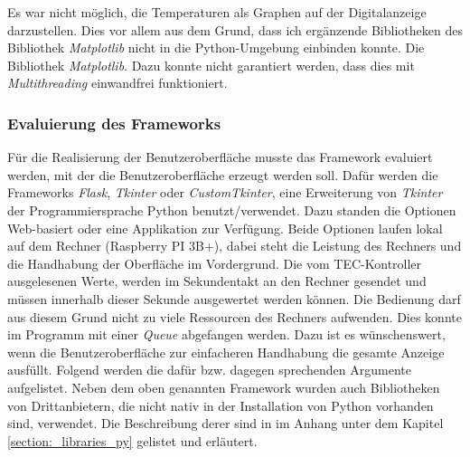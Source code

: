 Es war nicht möglich, die Temperaturen als Graphen auf der Digitalanzeige darzustellen. Dies vor allem aus dem Grund, dass ich ergänzende Bibliotheken des Bibliothek \textit{Matplotlib} nicht in die Python-Umgebung einbinden konnte. Die Bibliothek \textit{Matplotlib}. Dazu konnte nicht garantiert werden, dass dies mit \textit{Multithreading} einwandfrei funktioniert.

\subsubsection{Evaluierung des Frameworks}
Für die Realisierung der Benutzeroberfläche musste das Framework evaluiert werden, mit der die Benutzeroberfläche erzeugt werden soll. Dafür werden die Frameworks \textit{Flask}, \textit{Tkinter} oder \textit{CustomTkinter}, eine Erweiterung von \textit{Tkinter} der Programmiersprache Python benutzt/verwendet. Dazu standen die Optionen Web-basiert oder eine Applikation zur Verfügung. Beide Optionen laufen lokal auf dem Rechner (Raspberry PI 3B+), dabei steht die Leistung des Rechners und die Handhabung der Oberfläche im Vordergrund. Die vom TEC-Kontroller ausgelesenen Werte, werden im Sekundentakt an den Rechner gesendet und müssen innerhalb dieser Sekunde ausgewertet werden können. Die Bedienung darf aus diesem Grund nicht zu viele Ressourcen des Rechners aufwenden. Dies konnte im Programm mit einer \textit{Queue} abgefangen werden. Dazu ist es wünschenswert, wenn die Benutzeroberfläche zur einfacheren Handhabung die gesamte Anzeige ausfüllt. Folgend werden die dafür bzw. dagegen sprechenden Argumente aufgelistet.
Neben dem oben genannten Framework wurden auch Bibliotheken von Drittanbietern, die nicht nativ in der Installation von Python vorhanden sind, verwendet. Die Beschreibung derer sind in im Anhang unter dem Kapitel \ref{section:_libraries_py} gelistet und erläutert.

